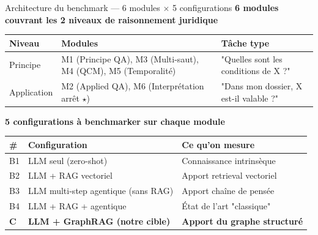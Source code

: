 \documentclass[aspectratio=169,10pt]{beamer}
\begin{document}
\begin{frame}{Architecture du benchmark --- 6 modules $\times$ 5 configurations}
  \textbf{6 modules couvrant les 2 niveaux de raisonnement juridique}

  \vspace{0.2em}
  \footnotesize
  \renewcommand{\arraystretch}{1.1}
  \begin{tabular}{@{}p{2cm} p{5.5cm} p{6.5cm}@{}}
    \toprule
    \textbf{Niveau} & \textbf{Modules} & \textbf{Tâche type} \\
    \midrule
    Principe    & M1 (Principe QA), M3 (Multi-saut), M4 (QCM), M5 (Temporalité) & "Quelles sont les conditions de X ?" \\
    Application & M2 (Applied QA), M6 (Interprétation arrêt $\star$) & "Dans mon dossier, X est-il valable ?" \\
    \bottomrule
  \end{tabular}

  \vspace{0.8em}
  \textbf{5 configurations à benchmarker sur chaque module}

  \vspace{0.3em}
  \footnotesize
  \begin{tabular}{@{}l l l@{}}
    \toprule
    \textbf{\#} & \textbf{Configuration} & \textbf{Ce qu'on mesure} \\
    \midrule
    B1 & LLM seul (zero-shot)                 & Connaissance intrinsèque \\
    B2 & LLM + RAG vectoriel                  & Apport retrieval vectoriel \\
    B3 & LLM multi-step agentique (sans RAG)  & Apport chaîne de pensée \\
    B4 & LLM + RAG + agentique                & État de l'art "classique" \\
    \textbf{C}  & \textbf{LLM + GraphRAG (notre cible)} & \textbf{Apport du graphe structuré} \\
    \bottomrule
  \end{tabular}
\end{frame}
\end{document}
